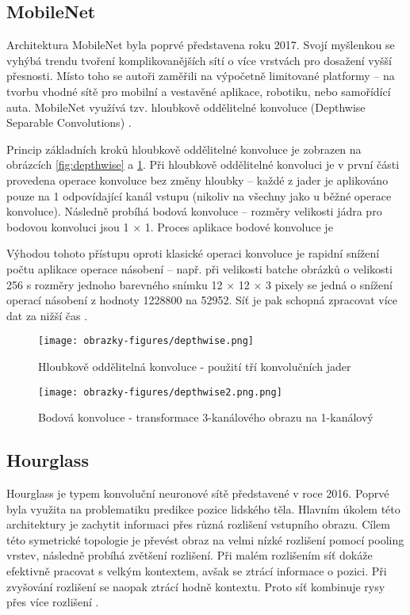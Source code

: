 \subsection*{MobileNet}
Architektura MobileNet byla poprvé představena roku 2017. Svojí myšlenkou se vyhýbá trendu tvoření komplikovanějších sítí o více vrstvách pro dosažení vyšší přesnosti. Místo toho se autoři zaměřili na výpočetně limitované platformy -- na tvorbu vhodné sítě pro mobilní a vestavěné aplikace, robotiku, nebo samořídící auta. MobileNet využívá tzv. hloubkově oddělitelné konvoluce (Depthwise Separable Convolutions) \cite{MobileNet}.

Princip základních kroků hloubkově oddělitelné konvoluce je zobrazen na obrázcích \ref{fig:depthwise} a \ref{fig:depthwise2}. Při hloubkově oddělitelné konvoluci je v první části provedena operace konvoluce bez změny hloubky -- každé z jader je aplikováno pouze na 1 odpovídající kanál vstupu (nikoliv na všechny jako u běžné operace konvoluce). Následně probíhá bodová konvoluce -- rozměry velikosti jádra pro bodovou konvoluci jsou 1 $\times$ 1. Proces aplikace bodové konvoluce je 

Výhodou tohoto přístupu oproti klasické operaci konvoluce je rapidní snížení počtu aplikace operace násobení -- např. při velikosti batche obrázků o velikosti 256 s rozměry jednoho barevného snímku 12 $\times$ 12 $\times$ 3 pixely se jedná o snížení operací násobení z hodnoty 1228800 na 52952. Síť je pak schopná zpracovat více dat za nižší čas \cite{SeparableConvolutions}. 

\begin{figure}[!htbp]
  \begin{minipage}[b]{0.5\linewidth}
    \centering
    \texttt{[image: obrazky-figures/depthwise.png]}
    \caption{Hloubkově oddělitelná konvoluce - použití tří konvolučních jader \cite{SeparableConvolutions}}
    \label{fig:depthwise}
  \end{minipage}
  \hspace{0.5cm}
  \begin{minipage}[b]{0.5\linewidth}
    \centering
    \texttt{[image: obrazky-figures/depthwise2.png.png]}
    \caption{Bodová konvoluce - transformace 3-kanálového obrazu na 1-kanálový \cite{SeparableConvolutions}}
    \label{fig:depthwise2}
  \end{minipage}
\end{figure}

\subsection*{Hourglass}
Hourglass je typem konvoluční neuronové sítě představené v roce 2016. Poprvé byla využita na problematiku predikce pozice lidského těla. Hlavním úkolem této architektury je zachytit informaci přes různá rozlišení vstupního obrazu. Cílem této symetrické topologie je převést obraz na velmi nízké rozlišení pomocí pooling vrstev, následně probíhá zvětšení rozlišení. Při malém rozlišením síť dokáže efektivně pracovat s velkým kontextem, avšak se ztrácí informace o pozici. Při zvyšování rozlišení se naopak ztrácí hodně kontextu. Proto síť kombinuje rysy přes více rozlišení \cite{Hourglass}.

